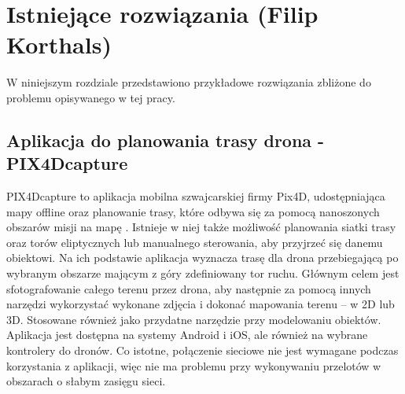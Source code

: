 \chapter{Istniejące rozwiązania (Filip Korthals)}
\label{chap:example solutions}

W niniejszym rozdziale przedstawiono przykładowe rozwiązania zbliżone do problemu opisywanego w tej pracy.

\section{Aplikacja do planowania trasy drona - PIX4Dcapture}

PIX4Dcapture to aplikacja mobilna szwajcarskiej firmy Pix4D, udostępniająca mapy offline oraz planowanie trasy, które odbywa się za pomocą nanoszonych obszarów misji na mapę \cite{pix4dcapture}. Istnieje w niej także możliwość planowania siatki trasy oraz torów eliptycznych lub manualnego sterowania, aby przyjrzeć się danemu obiektowi. Na ich podstawie aplikacja wyznacza trasę dla drona przebiegającą po wybranym obszarze mającym z góry zdefiniowany tor ruchu. Głównym celem jest sfotografowanie całego terenu przez drona, aby następnie za pomocą innych narzędzi wykorzystać wykonane zdjęcia i dokonać mapowania terenu – w 2D lub 3D. Stosowane również jako przydatne narzędzie przy modelowaniu obiektów. Aplikacja jest dostępna na systemy Android i iOS, ale również na wybrane kontrolery do dronów. Co istotne, połączenie sieciowe nie jest wymagane podczas korzystania z aplikacji, więc nie ma problemu przy wykonywaniu przelotów w obszarach o słabym zasięgu sieci.

